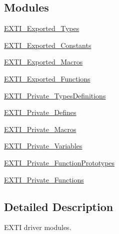 \subsection*{Modules}
\begin{DoxyCompactItemize}
\item 
\hyperlink{group___e_x_t_i___exported___types}{E\+X\+T\+I\+\_\+\+Exported\+\_\+\+Types}
\item 
\hyperlink{group___e_x_t_i___exported___constants}{E\+X\+T\+I\+\_\+\+Exported\+\_\+\+Constants}
\item 
\hyperlink{group___e_x_t_i___exported___macros}{E\+X\+T\+I\+\_\+\+Exported\+\_\+\+Macros}
\item 
\hyperlink{group___e_x_t_i___exported___functions}{E\+X\+T\+I\+\_\+\+Exported\+\_\+\+Functions}
\item 
\hyperlink{group___e_x_t_i___private___types_definitions}{E\+X\+T\+I\+\_\+\+Private\+\_\+\+Types\+Definitions}
\item 
\hyperlink{group___e_x_t_i___private___defines}{E\+X\+T\+I\+\_\+\+Private\+\_\+\+Defines}
\item 
\hyperlink{group___e_x_t_i___private___macros}{E\+X\+T\+I\+\_\+\+Private\+\_\+\+Macros}
\item 
\hyperlink{group___e_x_t_i___private___variables}{E\+X\+T\+I\+\_\+\+Private\+\_\+\+Variables}
\item 
\hyperlink{group___e_x_t_i___private___function_prototypes}{E\+X\+T\+I\+\_\+\+Private\+\_\+\+Function\+Prototypes}
\item 
\hyperlink{group___e_x_t_i___private___functions}{E\+X\+T\+I\+\_\+\+Private\+\_\+\+Functions}
\end{DoxyCompactItemize}


\subsection{Detailed Description}
E\+X\+TI driver modules. 

